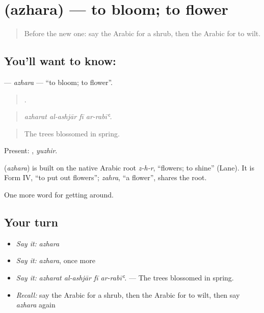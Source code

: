\section[\texorpdfstring{\ar{أزهر} (azhara)}{أزهر (azhara)}]{ (azhara) — to bloom; to flower}

\label{lesson:AR-C468-azhara}



\begin{quote}
Before the new one: say the Arabic for a shrub, then the Arabic for to wilt.
\end{quote}

\subsection*{You'll want to know: }
\textbf{} — \emph{azhara} — \textquotedblleft{}to bloom; to flower\textquotedblright{}.

\begin{quote}
   .
\end{quote}

\begin{quote}
\emph{azharat al-ashjār fī ar-rabīʿ.}
\end{quote}

\begin{quote}
The trees blossomed in spring.
\end{quote}

Present: , \emph{yuzhir}.

\begin{cousinweb}
\textbf{} (\emph{azhara}) is built on the native Arabic root \emph{z-h-r}, \textquotedblleft{}flowers; to shine\textquotedblright{} (Lane). It is Form IV, \textquotedblleft{}to put out flowers\textquotedblright{}; \emph{zahra}, \textquotedblleft{}a flower\textquotedblright{}, shares the root.
\end{cousinweb}

\begin{grammarlens}[title={What you've built}]
One more word for getting around.
\end{grammarlens}

\subsection*{Your turn}
\begin{itemize}
\raggedright
  \item \emph{Say it:} \emph{azhara}
  \item \emph{Say it:} \emph{azhara}, once more
  \item \emph{Say it:} \emph{azharat al-ashjār fī ar-rabīʿ.} — The trees blossomed in spring.
  \item \emph{Recall:} say the Arabic for a shrub, then the Arabic for to wilt, then say \emph{azhara} again
\end{itemize}

